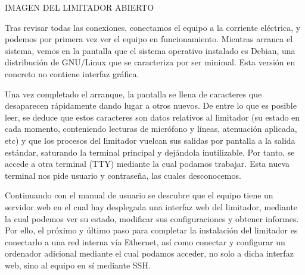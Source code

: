 IMAGEN DEL LIMITADOR ABIERTO

Tras revisar todas las conexiones, conectamos el equipo a la corriente eléctrica, y podemos por primera vez ver el equipo en funcionamiento. Mientras arranca el sistema, vemos en la pantalla que el sistema operativo instalado es Debian, una distribución de \gls{GNU/Linux} que se caracteriza por ser minimal. Esta versión en concreto no contiene interfaz gráfica.

Una vez completado el arranque, la pantalla se llena de caracteres que desaparecen rápidamente dando lugar a otros nuevos. De entre lo que es posible leer, se deduce que estos caracteres son datos relativos al limitador (su estado en cada momento, conteniendo lecturas de micrófono y líneas, atenuación aplicada, etc) y que los procesos del limitador vuelcan sus salidas por pantalla a la salida estándar, saturando la terminal principal y dejándola inutilizable. Por tanto, se accede a otra terminal (TTY) mediante la cual podamos trabajar. Esta nueva terminal nos pide usuario y contraseña, las cuales desconocemos.

Continuando con el manual de usuario se descubre que el equipo tiene un servidor web en el cual hay desplegada una interfaz web del limitador, mediante la cual podemos ver su estado, modificar sus configuraciones y obtener informes. Por ello, el próximo y último paso para completar la instalación del limitador es conectarlo a una red interna vía Ethernet, así como conectar y configurar un ordenador adicional mediante el cual podamos acceder, no solo a dicha interfaz web, sino al equipo en sí mediante \acrshort{SSH}.


